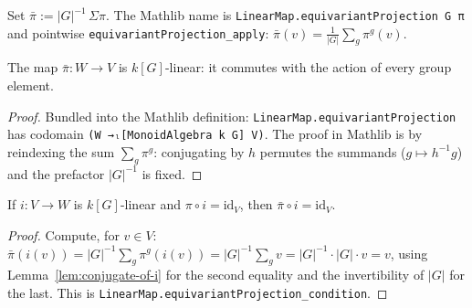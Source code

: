 \begin{definition}
  \label{def:equivariant-projection}
  \mathlibok
  Set $\bar\pi := |G|^{-1}\,\Sigma\pi$. The Mathlib name is
  \texttt{LinearMap.equivariantProjection G π} and pointwise
  \texttt{equivariantProjection\_apply}: $\bar\pi(v) =
  \frac{1}{|G|}\sum_g \pi^g(v)$.
\end{definition}

\begin{lemma}
  \label{lem:bar-pi-equivariant}
  \mathlibok
  The map $\bar\pi : W \to V$ is $k[G]$-linear: it commutes with the action
  of every group element.
\end{lemma}

\begin{proof}
  \leanok
  Bundled into the Mathlib definition: \texttt{LinearMap.equivariantProjection}
  has codomain \texttt{(W →ₗ[MonoidAlgebra k G] V)}. The proof in Mathlib is by
  reindexing the sum $\sum_g \pi^g$: conjugating by $h$ permutes the summands
  ($g \mapsto h^{-1} g$) and the prefactor $|G|^{-1}$ is fixed.
\end{proof}

\begin{lemma}
  \label{lem:bar-pi-retracts}
  \mathlibok
  If $i : V \to W$ is $k[G]$-linear and $\pi \circ i = \mathrm{id}_V$, then
  $\bar\pi \circ i = \mathrm{id}_V$.
\end{lemma}

\begin{proof}
  \leanok
  Compute, for $v \in V$:
  $\bar\pi(i(v)) = |G|^{-1}\sum_g \pi^g(i(v)) = |G|^{-1}\sum_g v
  = |G|^{-1}\cdot|G|\cdot v = v$,
  using Lemma~\ref{lem:conjugate-of-i} for the second equality and the
  invertibility of $|G|$ for the last. This is
  \texttt{LinearMap.equivariantProjection\_condition}.
\end{proof}

